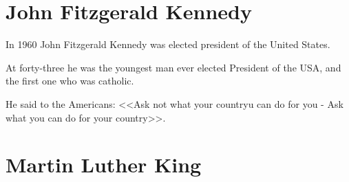 \section{John Fitzgerald Kennedy}
In 1960 John Fitzgerald Kennedy was elected president of the United States.

At forty-three he was the youngest man ever elected President of the USA, and the first one who was catholic.

He said to the Americans: <<Ask not what your countryu can do for you - Ask what you can do for your country>>.

\section{Martin Luther King}
